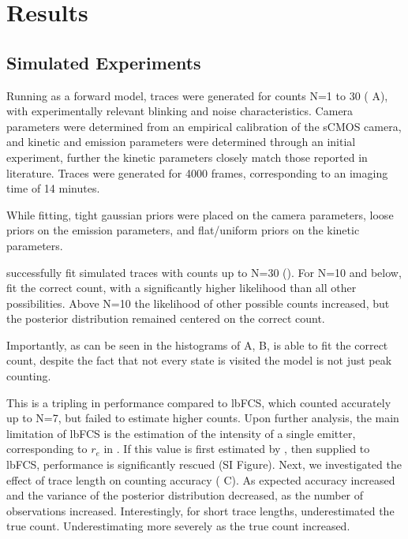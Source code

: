 \section{Results}

\subsection{Simulated Experiments}
Running \ours as a forward model, traces were generated for counts N=1 to 30
	( A), with experimentally relevant blinking and noise characteristics.
	Camera parameters were determined from an empirical calibration of the
	sCMOS camera, and kinetic and emission parameters were determined through an
	initial experiment, further the kinetic parameters closely match those reported
	in literature.
	Traces were generated for 4000 frames, corresponding to an imaging time of 
	14 minutes.

While fitting, tight gaussian priors were placed on the camera parameters,
	loose priors on the emission parameters, and flat/uniform priors on the
	kinetic parameters. 

\ours successfully fit simulated traces with counts up to N=30 ().
	For N=10 and below, \ours fit the correct count, with a significantly higher
	likelihood than all other possibilities. Above N=10 the likelihood of other 
	possible counts increased, but the posterior distribution remained
	centered on the correct count.

	Importantly, as can be seen in the histograms of  A, B, \ours is able to fit the correct count,
	despite the fact that not every state is visited \ie the model is not just peak counting.

This is a tripling in performance compared to lbFCS, which counted accurately up
	to N=7, but failed to estimate higher counts.
	Upon further analysis, the main limitation of lbFCS is the estimation of the 
	intensity of a single emitter, corresponding to $r_e$ in \ours. 
	If this value is first estimated by \ours, then supplied to lbFCS, performance is significantly rescued (SI Figure).
Next, we investigated the effect of trace length on counting accuracy ( C).
	As expected accuracy increased and the variance of the posterior distribution decreased, 
	as the number of observations increased.
	Interestingly, for short trace lengths, \ours underestimated the true count. Underestimating 
	more severely as the true count increased.

